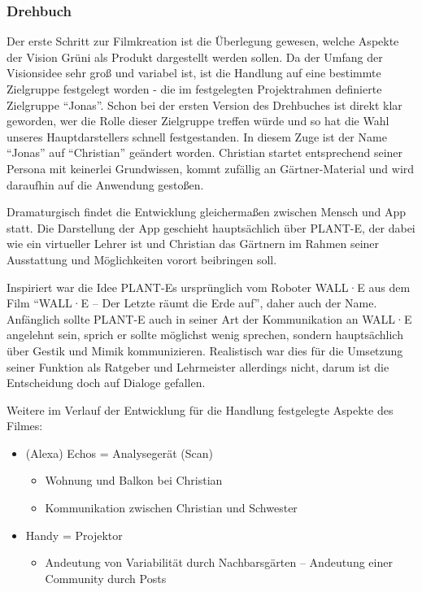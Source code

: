 \hypertarget{drehbuch}{%
\subsubsection{Drehbuch}\label{drehbuch}}

Der erste Schritt zur Filmkreation ist die Überlegung gewesen, welche
Aspekte der Vision Grüni als Produkt dargestellt werden sollen. Da der
Umfang der Visionsidee sehr groß und variabel ist, ist die Handlung auf
eine bestimmte Zielgruppe festgelegt worden - die im festgelegten
Projektrahmen definierte Zielgruppe ``Jonas''. Schon bei der ersten
Version des Drehbuches ist direkt klar geworden, wer die Rolle dieser
Zielgruppe treffen würde und so hat die Wahl unseres Hauptdarstellers
schnell festgestanden. In diesem Zuge ist der Name ``Jonas'' auf
``Christian'' geändert worden. Christian startet entsprechend seiner
Persona mit keinerlei Grundwissen, kommt zufällig an Gärtner-Material
und wird daraufhin auf die Anwendung gestoßen.

Dramaturgisch findet die Entwicklung gleichermaßen zwischen Mensch und
App statt. Die Darstellung der App geschieht hauptsächlich über PLANT-E,
der dabei wie ein virtueller Lehrer ist und Christian das Gärtnern im
Rahmen seiner Ausstattung und Möglichkeiten vorort beibringen soll.

Inspiriert war die Idee PLANT-Es ursprünglich vom Roboter WALL·E aus dem
Film ``WALL·E -- Der Letzte räumt die Erde auf'', daher auch der Name.
Anfänglich sollte PLANT-E auch in seiner Art der Kommunikation an WALL·E
angelehnt sein, sprich er sollte möglichst wenig sprechen, sondern
hauptsächlich über Gestik und Mimik kommunizieren. Realistisch war dies
für die Umsetzung seiner Funktion als Ratgeber und Lehrmeister
allerdings nicht, darum ist die Entscheidung doch auf Dialoge gefallen.

Weitere im Verlauf der Entwicklung für die Handlung festgelegte Aspekte
des Filmes:

\begin{itemize}
\tightlist
\item
  (Alexa) Echos = Analysegerät (Scan)

  \begin{itemize}
  \tightlist
  \item
    Wohnung und Balkon bei Christian
  \item
    Kommunikation zwischen Christian und Schwester
  \end{itemize}
\item
  Handy = Projektor

  \begin{itemize}
  \tightlist
  \item
    Andeutung von Variabilität durch Nachbarsgärten -- Andeutung einer
    Community durch Posts
  \end{itemize}
\end{itemize}

